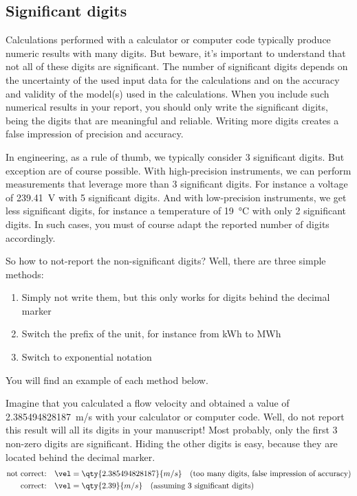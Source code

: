 \subsection{Significant digits}
Calculations performed with a calculator or computer code typically produce numeric results with  many digits. But beware, it's important to understand that not all of these digits are significant. The number of significant digits depends on the uncertainty of the used input data for the calculations and on the accuracy and validity of the model(s) used in the calculations. When you include such numerical results in your report, you should only write the significant digits, being the digits that are meaningful and reliable. Writing more digits creates a false impression of precision and accuracy.

In engineering, as a rule of thumb, we typically consider 3 significant digits. But exception are of course possible. With high-precision instruments, we can perform measurements that leverage more than 3 significant digits. For instance a voltage of \qty{239.41}{\volt} with 5 significant digits. And with low-precision instruments, we get less significant digits, for instance a temperature of \qty{19}{\celsius} with only 2 significant digits. In such cases, you must of course adapt the reported number of digits accordingly.

So how to not-report the non-significant digits? Well, there are three simple methods:

\begin{enumerate}
    \item Simply not write them, but this only works for digits behind the decimal marker
    \item Switch the prefix of the unit, for instance from kWh to MWh
    \item Switch to exponential notation
\end{enumerate}

You will find an example of each method below.

Imagine that you calculated a flow velocity and obtained a value of \qty{2.385494828187}{m/s} with your calculator or computer code. Well, do not report this result will all its digits in your manuscript! Most probably, only the first 3 non-zero digits are significant. Hiding the other digits is easy, because they are located behind the decimal marker. 
\begin{align*}
    \text{not correct:} \quad & \vel = \qty{2.385494828187}{m/s} \quad \text{(too many digits, false impression of accuracy)} \\
    \text{correct:}     \quad & \vel = \qty{2.39}{m/s} \quad \text{(assuming 3 significant digits)}
\end{align*}

